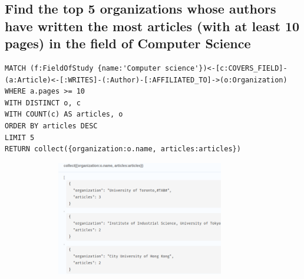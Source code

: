 \documentclass{Configuration_Files/PoliMi3i_thesis}
\begin{document}
\subsection{Find the top 5 organizations whose authors have written the most articles (with at least 10 pages) in the field of Computer Science}
\begin{lstlisting}[language=cypher, label=lst:cypher-example]
MATCH (f:FieldOfStudy {name:'Computer science'})<-[c:COVERS_FIELD]-(a:Article)<-[:WRITES]-(:Author)-[:AFFILIATED_TO]->(o:Organization)
WHERE a.pages >= 10
WITH DISTINCT o, c
WITH COUNT(c) AS articles, o
ORDER BY articles DESC
LIMIT 5
RETURN collect({organization:o.name, articles:articles})
\end{lstlisting}
\begin{figure}[H]
    \centering
    \includegraphics[width=100mm,height=50mm]{Images/query_4.png}
        \caption{}
    \label{fig:quadtree}
\end{figure}
\end{document}
